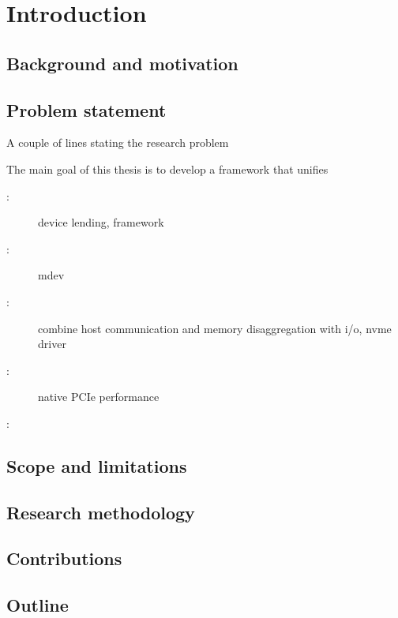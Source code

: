 \chapter{Introduction}\label{sec:intro}
\section{Background and motivation}

\section{Problem statement}\label{sec:objectives}
A couple of lines stating the research problem


The main goal of this thesis is to develop a framework that unifies
\begin{description}
	\item[:] device lending, framework
	\item[:] mdev
	\item[:] combine host communication and memory disaggregation with i/o, nvme driver
	\item[:] native PCIe performance
	\item[:]
	
\end{description}

\section{Scope and limitations}

\section{Research methodology}

\section{Contributions}

\section{Outline}
